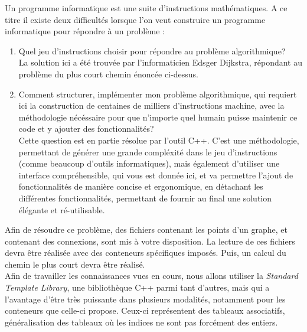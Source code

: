 \documentclass[9pts]{article}
\begin{document}
Un programme informatique est une suite d'instructions mathématiques. A ce titre il existe deux difficultés lorsque l'on veut construire un programme informatique pour répondre à un problème :
\begin{enumerate}
\item Quel jeu d'instructions choisir pour répondre au problème algorithmique?\\
La solution ici a été trouvée par l'informaticien Edsger Dijkstra, répondant au problème du plus court chemin énoncée ci-dessus.

\item Comment structurer, implémenter mon problème algorithmique, qui requiert ici la construction de centaines de milliers d'instructions machine, avec la méthodologie nécéssaire pour que n'importe quel humain puisse maintenir ce code et y ajouter des fonctionnalités?\\
Cette question est en partie résolue par l'outil C++. C'est une méthodologie, permettant de générer une grande compléxité dans le jeu d'instructions (comme beaucoup d'outils informatiques), mais également d'utiliser une interface compréhensible, qui vous est donnée ici, et va permettre l'ajout de fonctionnalités de manière concise et ergonomique, en détachant les différentes fonctionnalités, permettant de fournir au final une solution élégante et ré-utilisable.
\end{enumerate}


Afin de résoudre ce problème, des fichiers contenant les points d'un graphe, et contenant des connexions, sont mis à votre disposition. La lecture de ces fichiers devra être réalisée avec des conteneurs spécifiques imposés. Puis, un calcul du chemin le plus court devra être réalisé.\\

Afin de travailler les connaissances vues en cours, nous allons utiliser la \emph{Standard Template Library}, une bibliothèque C++ parmi tant d'autres, mais qui a l'avantage d'être très puissante dans plusieurs modalités, notamment pour les conteneurs que celle-ci propose. Ceux-ci représentent des tableaux associatifs, généralisation des tableaux où les indices ne sont pas forcément des entiers.\\
\end{document}
